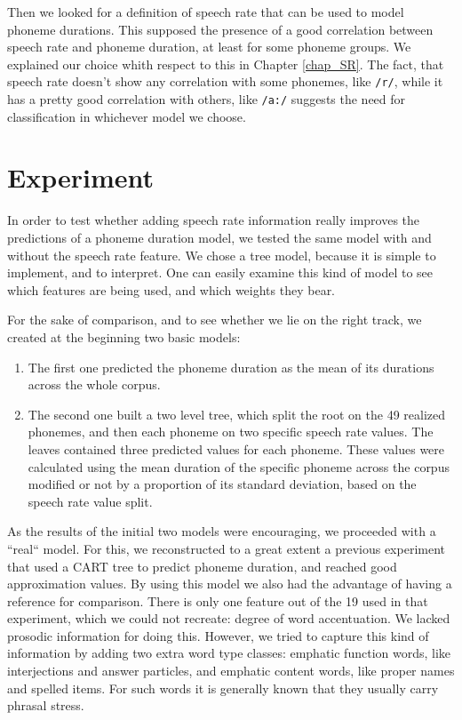 \documentclass[11pt,a4paper]{scrbook}
\begin{document}
Then we looked for a definition of speech rate that can be used to model phoneme durations. This supposed the presence of a good correlation between speech rate and phoneme duration, at least for some phoneme groups. We explained our choice whith respect to this in Chapter \ref{chap_SR}. 
The fact, that speech rate doesn't show any correlation with some phonemes, like \texttt{/r/}, while it has a pretty good correlation with others, like \texttt{/a:/} suggests the need for classification in whichever model we choose.

\section{Experiment}
In order to test whether adding speech rate information really improves the predictions of a phoneme duration model, we tested the same model with and without the speech rate feature. We chose a tree model, because it is simple to implement, and to interpret. One can easily examine this kind of model to see which features are being used, and which weights they bear. 

For the sake of comparison, and to see whether we lie on the right track, we created at the beginning two basic models: 

\begin{enumerate}
	\item The first one predicted the phoneme duration as the mean of its durations across the whole corpus. 
	\item The second one built a two level tree, which split the root on the 49 realized phonemes, and then each phoneme on two specific speech rate values. The leaves contained three predicted values for each phoneme. These values were calculated using the mean duration of the specific phoneme across the corpus modified or not by a proportion of its standard deviation, based on the speech rate value split. 
\end{enumerate}

As the results of the initial two models were encouraging, we proceeded with a ``real`` model. For this, we reconstructed to a great extent a previous experiment \cite{Brinckmann_2003} that used a CART tree to predict phoneme duration, and reached good approximation values. By using this model we also had the advantage of having a reference for comparison. There is only one feature out of the 19 used in that experiment, which we could not recreate: degree of word accentuation. We lacked prosodic information for doing this. However, we tried to capture this kind of information by adding two extra word type classes: emphatic function words, like interjections and answer particles, and emphatic content words, like proper names and spelled items. For such words it is generally known that they usually carry phrasal stress.
\end{document}

